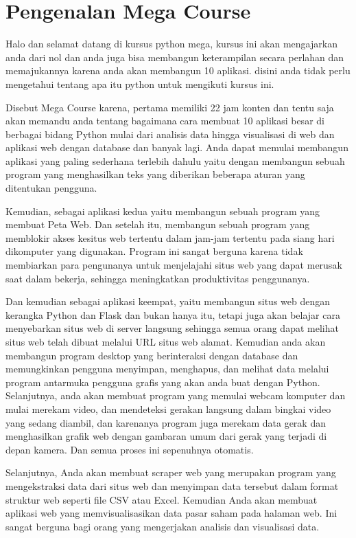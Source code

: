 \section{Pengenalan Mega Course}

Halo dan selamat datang di kursus python mega, kursus ini akan mengajarkan anda dari nol dan anda juga bisa membangun keterampilan secara perlahan dan memajukannya karena anda akan membangun 10 aplikasi. disini anda tidak perlu mengetahui tentang apa itu python untuk mengikuti kursus ini.

Disebut Mega Course karena, pertama memiliki 22 jam konten dan tentu saja akan memandu anda tentang bagaimana cara membuat 10 aplikasi besar di berbagai bidang Python mulai dari analisis data hingga visualisasi di web dan aplikasi web dengan database dan banyak lagi. Anda dapat memulai membangun aplikasi yang paling sederhana terlebih dahulu yaitu dengan membangun sebuah program yang menghasilkan teks yang diberikan beberapa aturan yang ditentukan pengguna.

Kemudian, sebagai aplikasi kedua yaitu membangun sebuah program yang membuat Peta Web. Dan setelah itu, membangun sebuah program yang memblokir akses kesitus web tertentu dalam jam-jam tertentu pada siang hari dikomputer yang digunakan. Program ini sangat berguna karena tidak membiarkan para pengunanya untuk menjelajahi situs web yang dapat merusak saat dalam bekerja, sehingga meningkatkan produktivitas penggunanya.

Dan kemudian sebagai aplikasi keempat, yaitu membangun situs web dengan kerangka Python dan Flask dan bukan hanya itu, tetapi juga akan belajar cara menyebarkan situs web di server langsung sehingga semua orang dapat melihat situs web telah dibuat melalui URL situs web alamat. Kemudian anda akan membangun program desktop yang berinteraksi dengan database dan memungkinkan pengguna menyimpan, menghapus, dan melihat data melalui program antarmuka pengguna grafis yang akan anda buat dengan Python. Selanjutnya, anda akan membuat program yang memulai webcam komputer dan mulai merekam video, dan mendeteksi gerakan langsung dalam bingkai video yang sedang diambil, dan karenanya program juga merekam data gerak dan menghasilkan grafik web dengan gambaran umum dari gerak yang terjadi di depan kamera. Dan semua proses ini sepenuhnya otomatis.

Selanjutnya, Anda akan membuat scraper web yang merupakan program yang mengekstraksi data dari situs web dan menyimpan data tersebut dalam format struktur web seperti file CSV atau Excel. Kemudian Anda akan membuat aplikasi web yang memvisualisasikan data pasar saham pada halaman web. Ini sangat berguna bagi orang yang mengerjakan analisis dan visualisasi data.

